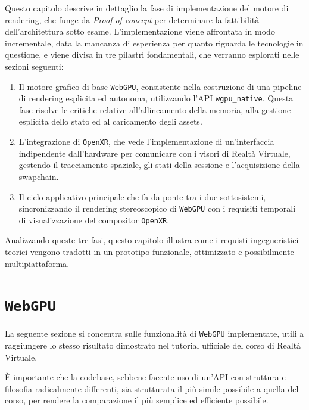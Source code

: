 \documentclass[a4paper, 11pt, twoside]{report}
\begin{document}
Questo capitolo descrive in dettaglio la fase di implementazione del motore di rendering, che funge da \textit{Proof of
concept} per determinare la fattibilità dell'architettura sotto esame.
L'implementazione viene affrontata in modo incrementale, data la mancanza di esperienza per quanto riguarda le
tecnologie in questione, e viene divisa in tre pilastri fondamentali, che verranno esplorati nelle sezioni seguenti:

\begin{enumerate}
    \item Il motore grafico di base \texttt{WebGPU}, consistente nella costruzione di una pipeline di rendering 
        esplicita ed autonoma, utilizzando l'API \texttt{wgpu\_native}. Questa fase risolve le critiche relative
        all'allineamento della memoria, alla gestione esplicita dello stato ed al caricamento degli assets.
    \item L'integrazione di \texttt{\gls{OpenXR}}, che vede l'implementazione di un'interfaccia indipendente
        dall'hardware per comunicare con i visori di Realtà Virtuale, gestendo il tracciamento spaziale, gli stati della
        sessione e l'acquisizione della swapchain.
    \item Il ciclo applicativo principale che fa da ponte tra i due sottosistemi, sincronizzando il rendering
        stereoscopico di \texttt{WebGPU} con i requisiti temporali di visualizzazione del compositor
        \texttt{\gls{OpenXR}}.
\end{enumerate}

Analizzando queste tre fasi, questo capitolo illustra come i requisti ingegneristici teorici vengono tradotti in un
prototipo funzionale, ottimizzato e possibilmente multipiattaforma.

\newpage

\section{\texttt{WebGPU}}

La seguente sezione si concentra sulle funzionalità di \texttt{WebGPU} implementate, utili a raggiungere lo stesso
risultato dimostrato nel tutorial ufficiale del corso di Realtà Virtuale.

È importante che la codebase, sebbene facente uso di un'API con struttura e filosofia radicalmente differenti, sia
strutturata il più simile possibile a quella del corso, per rendere la comparazione il più semplice ed efficiente
possibile.
\end{document}
